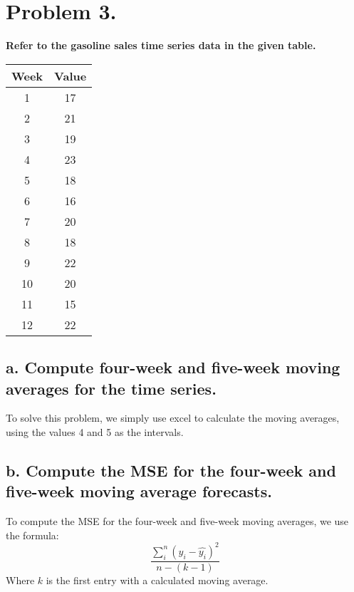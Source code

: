 \documentclass{report}
\begin{document}
\section{Problem 3.}
\textbf{Refer to the gasoline sales time series data in the given table.}

\begin{table}[ht]
\centering
\begin{tabular}{cc}
\toprule
Week & Value \\
\midrule
1 & 17 \\
2 & 21 \\
3 & 19 \\
4 & 23 \\
5 & 18 \\
6 & 16 \\
7 & 20 \\
8 & 18 \\
9 & 22 \\
10 & 20 \\
11 & 15 \\
12 & 22 \\
\bottomrule
\end{tabular}
\end{table}
\subsection*{a. Compute four-week and five-week moving averages for the time series.}
To solve this problem, we simply use excel to calculate the moving averages, using the values 4 and 5 as the intervals.
\newpage
\subsection*{b. Compute the MSE for the four-week and five-week moving average forecasts.}
To compute the MSE for the four-week and five-week moving averages, we use the formula:
$$ \dfrac{\displaystyle\sum_{i}^{n}(y_i - \hat{y_i})^2}{n - (k - 1)}$$
Where $k$ is the first entry with a calculated moving average.
\bigbreak \noindent
\end{document}
